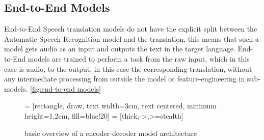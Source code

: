 \subsection{End-to-End Models}
End-to-End Speech translation models do not have the explicit split between the Automatic Speech Recognition model and the translation, this means that such a model gets audio as an input and outputs the text in the target language. 
End-to-End models are trained to perform a task from the raw input, which in this case is audio, to the output, in this case the corresponding translation, without any intermediate processing from outside the model or feature-engineering in sub-models. \autoref{fig:end-to-end models}
\begin{figure}
    \centering%
     = [rectangle, draw, text width=3cm, text centered, minimum height=1.2cm, fill=blue!20]
 = [thick,->,>=stealth]

\caption{basic overview of a encoder-decoder model architecture}
\label{fig:end-to-end models}
\end{figure}
